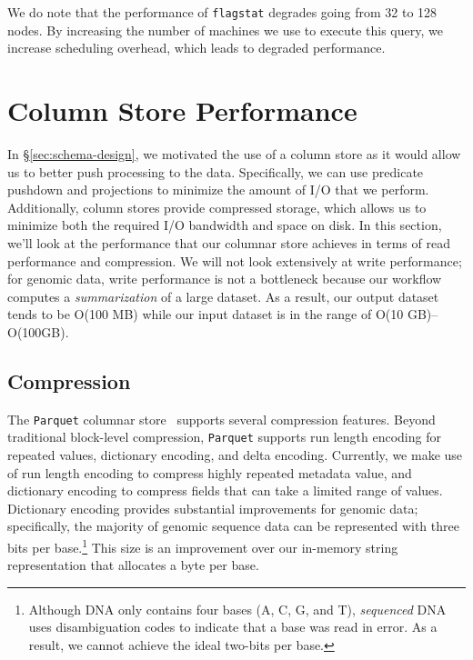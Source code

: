 \documentclass[masters]{ucbthesis}
\begin{document}
We do note that the performance of \texttt{flagstat} degrades going from 32 to 128 nodes. By increasing the
number of machines we use to execute this query, we increase scheduling overhead, which leads to degraded
performance.

\section{Column Store Performance}
\label{sec:column-store-perf}

In \S\ref{sec:schema-design}, we motivated the use of a column store as it would allow us to better push processing to
the data. Specifically, we can use predicate pushdown and projections to minimize the amount of I/O that we
perform. Additionally, column stores provide compressed storage, which allows us to minimize both the required
I/O bandwidth and space on disk. In this section, we'll look at the performance that our columnar store achieves
in terms of read performance and compression. We will not look extensively at write performance; for genomic
data, write performance is not a bottleneck because our workflow computes a \emph{summarization} of a large
dataset. As a result, our output dataset tends to be O(100 MB) while our input dataset is in the range of
O(10 GB)--O(100GB).

\subsection{Compression}
\label{sec:compression}

The \texttt{Parquet} columnar store~\cite{parquet} supports several compression features. Beyond traditional block-level
compression, \texttt{Parquet} supports run length encoding for repeated values, dictionary encoding, and delta
encoding. Currently, we make use of run length encoding to compress highly repeated metadata value,
and dictionary encoding to compress fields that can take a limited range of values. Dictionary encoding provides
substantial improvements for genomic data; specifically, the majority of genomic sequence data can be
represented with three bits per base.\footnote{Although DNA only contains four bases (A, C, G, and T),
\emph{sequenced} DNA uses disambiguation codes to indicate that a base was read in error. As a result, we
cannot achieve the ideal two-bits per base.} This size is an improvement over our in-memory string representation
that allocates a byte per base.
\end{document}
